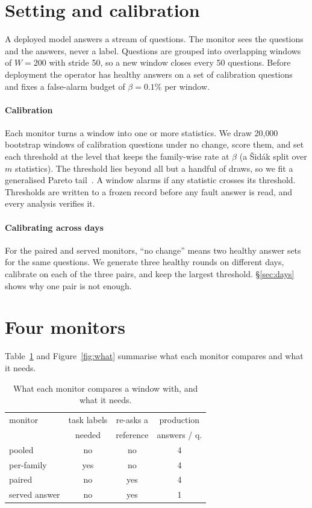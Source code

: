 \documentclass[11pt]{article}
\begin{document}
\section{Setting and calibration}
\label{sec:method}

A deployed model answers a stream of questions. The monitor sees the questions and
the answers, never a label. Questions are grouped into overlapping windows of
$W=200$ with stride 50, so a new window closes every 50 questions. Before
deployment the operator has healthy answers on a set of calibration questions and
fixes a false-alarm budget of $\beta=0.1\%$ per window.

\paragraph{Calibration} Each monitor turns a window into one or more statistics. We
draw 20{,}000 bootstrap windows of calibration questions under no change, score
them, and set each threshold at the level that keeps the family-wise rate at
$\beta$ (a Šidák split over $m$ statistics). The threshold lies beyond all but a
handful of draws, so we fit a generalised Pareto tail~\citep{pickands1975statistical}.
A window alarms if any statistic crosses its threshold. Thresholds are written to a
frozen record before any fault answer is read, and every analysis verifies it.

\paragraph{Calibrating across days} For the paired and served monitors, ``no
change'' means two healthy answer sets for the same questions. We generate three
healthy rounds on different days, calibrate on each of the three pairs, and keep
the largest threshold. \S\ref{sec:days} shows why one pair is not enough.

\section{Four monitors}
\label{sec:monitors}

Table~\ref{tab:what} and Figure~\ref{fig:what} summarise what each monitor
compares and what it needs.

\begin{table}[t]
  \centering\small
  \caption{What each monitor compares a window with, and what it needs.}
  \label{tab:what}
  \setlength{\tabcolsep}{3pt}
  \begin{tabular}{lccc}
    \toprule
    monitor & task labels & re-asks a & production \\
            & needed      & reference & answers / q. \\
    \midrule
    pooled        & no  & no  & 4 \\
    per-family    & yes & no  & 4 \\
    paired        & no  & yes & 4 \\
    served answer & no  & yes & 1 \\
    \bottomrule
  \end{tabular}
\end{table}
\end{document}
